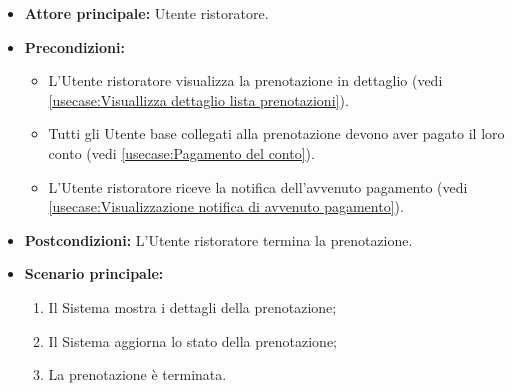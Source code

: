 \label{usecase:Termina prenotazione}
\begin{itemize}
	\item \textbf{Attore principale:} Utente ristoratore.

	\item \textbf{Precondizioni:} 
    \begin{itemize}
        \item L'Utente ristoratore visualizza la prenotazione in dettaglio (vedi \autoref{usecase:Visuallizza dettaglio lista prenotazioni}).
        \item Tutti gli Utente base collegati alla prenotazione devono aver pagato il loro conto (vedi \autoref{usecase:Pagamento del conto}).
        \item L'Utente ristoratore riceve la notifica dell'avvenuto pagamento (vedi \autoref{usecase:Visualizzazione notifica di avvenuto pagamento}).
    \end{itemize}

	\item \textbf{Postcondizioni:} L'Utente ristoratore termina la prenotazione.


	\item \textbf{Scenario principale:}
	      \begin{enumerate}
		      \item Il Sistema mostra i dettagli della prenotazione;
		      \item Il Sistema aggiorna lo stato della prenotazione;
		      \item La prenotazione è terminata.
	      \end{enumerate}
\end{itemize}
